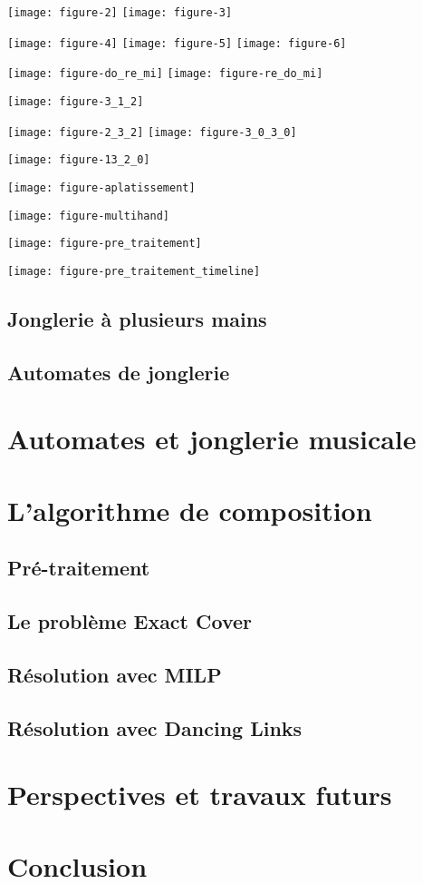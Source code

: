 \documentclass[a4paper]{easychair}
\begin{document}
\texttt{[image: figure-2]}
\texttt{[image: figure-3]}

\texttt{[image: figure-4]}
\texttt{[image: figure-5]}
\texttt{[image: figure-6]}

\texttt{[image: figure-do\_re\_mi]}
\texttt{[image: figure-re\_do\_mi]}

\texttt{[image: figure-3\_1\_2]}

\texttt{[image: figure-2\_3\_2]}
\texttt{[image: figure-3\_0\_3\_0]}

\texttt{[image: figure-13\_2\_0]}

\texttt{[image: figure-aplatissement]}

\texttt{[image: figure-multihand]}

\texttt{[image: figure-pre\_traitement]}

\texttt{[image: figure-pre\_traitement\_timeline]}

\subsection{Jonglerie à plusieurs mains}

\subsection{Automates de jonglerie}



\section{Automates et jonglerie musicale}

\section{L'algorithme de composition}
\subsection{Pré-traitement}
\subsection{Le problème Exact Cover}
\subsection{Résolution avec MILP}
\subsection{Résolution avec Dancing Links}

\section{Perspectives et travaux futurs}

\section{Conclusion}
\label{sec:conclusion}



\end{document}
